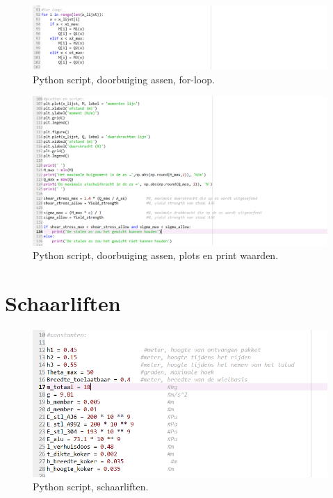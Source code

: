 \vspace{\baselineskip}

\begin{figure}[H]
    \centering
    \includegraphics[width = 120mm]{06_bijlage_F/As_script/Doorbuiging_as_forloop.PNG}
    \caption{Python script, doorbuiging assen, for-loop.}
    \label{fig:python_d.a._forloop}
\end{figure}

\vspace{\baselineskip}

\begin{figure}[H]
    \centering
    \includegraphics[width = 120mm]{06_bijlage_F/As_script/Doorbuiging_as_plottenprinten.PNG}
    \caption{Python script, doorbuiging assen, plots en print waarden.}
    \label{fig:python_d.a._plotsenprints}
\end{figure}
\vspace{\baselineskip}

\section{Schaarliften}
\label{se: bijlage_F schaarliften}
\vspace{\baselineskip}

\begin{figure}[H]
    \centering
    \includegraphics[width = 120mm]{04_conceptdimensionering/Constanten_schaarlift.PNG}
    \caption{Python script, schaarliften.}
    \label{fig:schaarliften_constanten}
\end{figure}
\vspace{\baselineskip}

